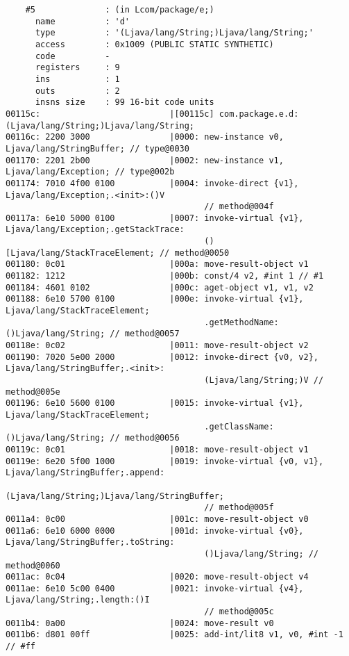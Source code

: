 \begin{lstlisting}
    #5              : (in Lcom/package/e;)
      name          : 'd'
      type          : '(Ljava/lang/String;)Ljava/lang/String;'
      access        : 0x1009 (PUBLIC STATIC SYNTHETIC)
      code          -
      registers     : 9
      ins           : 1
      outs          : 2
      insns size    : 99 16-bit code units
00115c:                          |[00115c] com.package.e.d:(Ljava/lang/String;)Ljava/lang/String;
00116c: 2200 3000                |0000: new-instance v0, Ljava/lang/StringBuffer; // type@0030
001170: 2201 2b00                |0002: new-instance v1, Ljava/lang/Exception; // type@002b
001174: 7010 4f00 0100           |0004: invoke-direct {v1}, Ljava/lang/Exception;.<init>:()V
                                        // method@004f
00117a: 6e10 5000 0100           |0007: invoke-virtual {v1}, Ljava/lang/Exception;.getStackTrace:
                                        ()[Ljava/lang/StackTraceElement; // method@0050
001180: 0c01                     |000a: move-result-object v1
001182: 1212                     |000b: const/4 v2, #int 1 // #1
001184: 4601 0102                |000c: aget-object v1, v1, v2
001188: 6e10 5700 0100           |000e: invoke-virtual {v1}, Ljava/lang/StackTraceElement;
                                        .getMethodName:()Ljava/lang/String; // method@0057
00118e: 0c02                     |0011: move-result-object v2
001190: 7020 5e00 2000           |0012: invoke-direct {v0, v2}, Ljava/lang/StringBuffer;.<init>:
                                        (Ljava/lang/String;)V // method@005e
001196: 6e10 5600 0100           |0015: invoke-virtual {v1}, Ljava/lang/StackTraceElement;
                                        .getClassName:()Ljava/lang/String; // method@0056
00119c: 0c01                     |0018: move-result-object v1
00119e: 6e20 5f00 1000           |0019: invoke-virtual {v0, v1}, Ljava/lang/StringBuffer;.append:
                                        (Ljava/lang/String;)Ljava/lang/StringBuffer;
                                        // method@005f
0011a4: 0c00                     |001c: move-result-object v0
0011a6: 6e10 6000 0000           |001d: invoke-virtual {v0}, Ljava/lang/StringBuffer;.toString:
                                        ()Ljava/lang/String; // method@0060
0011ac: 0c04                     |0020: move-result-object v4
0011ae: 6e10 5c00 0400           |0021: invoke-virtual {v4}, Ljava/lang/String;.length:()I
                                        // method@005c
0011b4: 0a00                     |0024: move-result v0
0011b6: d801 00ff                |0025: add-int/lit8 v1, v0, #int -1 // #ff

\end{lstlisting}
